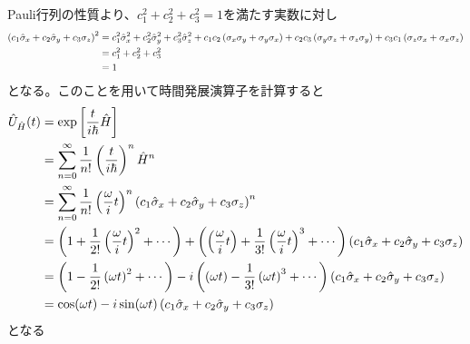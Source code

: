 \documentclass{jsarticle}  %
\numberwithin{equation}{section} %
\numberwithin{figure}{section}
\begin{document}
    \begin{proofline}
        Pauli行列の性質より、$c_1^2 + c_2^2 + c_3^2=1$を満たす実数に対し
        \begin{align}
            \left( c_1 \hat{\sigma}_x + c_2 \hat{\sigma}_y + c_3 \sigma_z \right)^2 &= c_1^2 \hat{\sigma}_x^2 + c_2^2 \hat{\sigma}_y^2 + c_3^2 \hat{\sigma}_z^2 +c_1c_2\left( \sigma_x \sigma_y + \sigma_y \sigma_x \right) + c_2c_3\left( \sigma_y \sigma_z + \sigma_z \sigma_y \right) + c_3c_1\left( \sigma_z \sigma_x + \sigma_x \sigma_z \right) \notag \\
            &= c_1^2 + c_2^2 + c_3^2 \notag \\
            &= 1
        \end{align}
        となる。このことを用いて時間発展演算子を計算すると
        \begin{align}
            \hat{U}_{\hat{H}}(t) &= \exp \left[ \frac{t}{i\hbar} \hat{H} \right] \notag \\
            &= \sum_{n=0}^\infty \frac{1}{n!} \left( \frac{t}{i\hbar} \right)^n \hat{H}^n \notag \\
            &= \sum_{n=0}^\infty \frac{1}{n!} \left( \frac{\omega}{i}t \right)^n \left( c_1 \hat{\sigma}_x + c_2 \hat{\sigma}_y + c_3 \sigma_z \right)^n \notag \\
            &= \left( 1 + \frac{1}{2!} \left( \frac{\omega}{i}t \right)^2  + \cdots \right) + \left( \left( \frac{\omega}{i}t \right)+ \frac{1}{3!} \left( \frac{\omega}{i}t \right)^3 + \cdots \right)\left( c_1 \hat{\sigma}_x + c_2 \hat{\sigma}_y + c_3 \sigma_z \right) \notag \\
            &= \left( 1 - \frac{1}{2!} \left( \omega t \right)^2  + \cdots \right) -i \left( \left( \omega t \right) - \frac{1}{3!} \left( \omega t \right)^3 + \cdots \right)\left( c_1 \hat{\sigma}_x + c_2 \hat{\sigma}_y + c_3 \sigma_z \right) \notag \\
            &= \cos (\omega t) - i\sin (\omega t) \left( c_1 \hat{\sigma}_x + c_2 \hat{\sigma}_y + c_3 \sigma_z \right)
        \end{align}
        となる
    \end{proofline}
\end{document}
